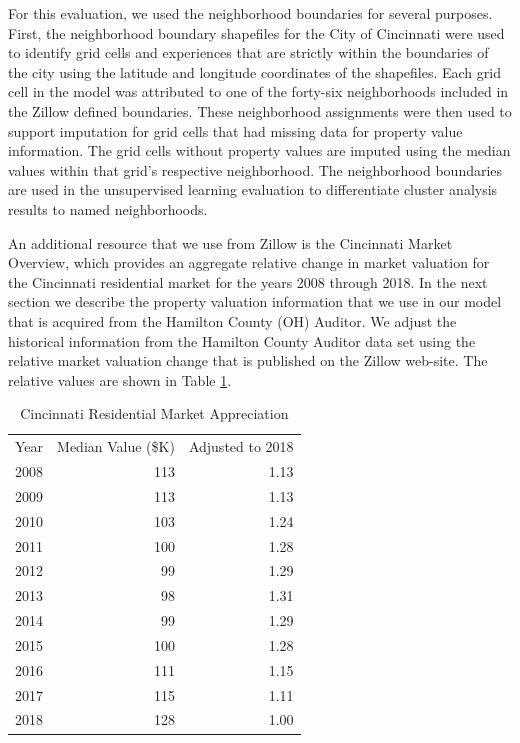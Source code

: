 \documentclass{llncs}
\begin{document}
For this evaluation, we used the neighborhood boundaries for several purposes. First, the neighborhood boundary shapefiles for the City of Cincinnati were used to identify grid cells and experiences that are strictly within the boundaries of the city using the latitude and longitude coordinates of the shapefiles. Each grid cell in the model was attributed to one of the forty-six neighborhoods included in the Zillow defined boundaries. These neighborhood assignments were then used to support imputation for grid cells that had missing data for property value information. The grid cells without property values are imputed using the median values within that grid's respective neighborhood. The neighborhood boundaries are used in the unsupervised learning evaluation to differentiate cluster analysis results to named neighborhoods. 

An additional resource that we use from Zillow is the Cincinnati Market Overview, which provides an aggregate relative change in market valuation for the Cincinnati residential market for the years 2008 through 2018.  In the next section we describe the property valuation information that we use in our model that is acquired from the Hamilton County (OH) Auditor. We adjust the historical information from the Hamilton County Auditor data set using the relative market valuation change that is published on the Zillow web-site. The relative values are shown in Table \ref{table : marketappreciation}.

\FloatBarrier
\begin{table}[!h]
\begin{center}
\caption{Cincinnati Residential Market Appreciation}
\label{table : marketappreciation}
\begin{tabular}{lrr}
\hline
\rule{0pt}{12pt}
Year	&	Median Value (\$K)	&	Adjusted to 2018	\\
2008	&	113	&	1.13	\\
2009	&	113	&	1.13	\\
2010	&	103	&	1.24	\\
2011	&	100	&	1.28	\\
2012	&	99	&	1.29	\\
2013	&	98	&	1.31	\\
2014	&	99	&	1.29	\\
2015	&	100	&	1.28	\\
2016	&	111	&	1.15	\\
2017	&	115	&	1.11	\\
2018	&	128	&	1.00	\\[2pt]
\hline
\end{tabular}
\end{center}
\end{table}
\FloatBarrier
%
\end{document}
